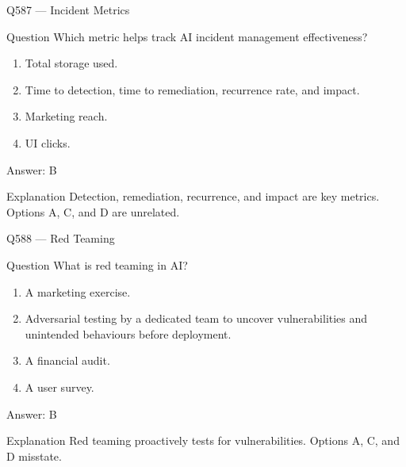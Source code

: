 \documentclass[aspectratio=169,8pt]{beamer}
\begin{document}
	\begin{frame}{Q587 --- Incident Metrics}
		\begin{block}{Question}
			Which metric helps track AI incident management effectiveness?
			\begin{enumerate}
				\item Total storage used.
				\item Time to detection, time to remediation, recurrence rate, and impact.
				\item Marketing reach.
				\item UI clicks.
			\end{enumerate}
		\end{block}
		\begin{exampleblock}{Answer: B}\end{exampleblock}
		\begin{block}{Explanation}
			Detection, remediation, recurrence, and impact are key metrics. Options A, C, and D are unrelated.
		\end{block}
	\end{frame}
	
	\begin{frame}{Q588 --- Red Teaming}
		\begin{block}{Question}
			What is red teaming in AI?
			\begin{enumerate}
				\item A marketing exercise.
				\item Adversarial testing by a dedicated team to uncover vulnerabilities and unintended behaviours before deployment.
				\item A financial audit.
				\item A user survey.
			\end{enumerate}
		\end{block}
		\begin{exampleblock}{Answer: B}\end{exampleblock}
		\begin{block}{Explanation}
			Red teaming proactively tests for vulnerabilities. Options A, C, and D misstate.
		\end{block}
	\end{frame}
	
\end{document}
